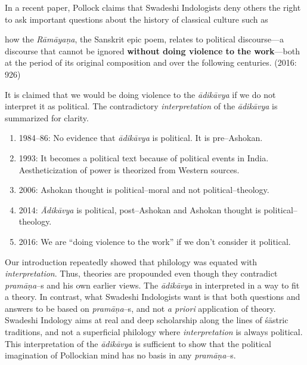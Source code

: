 In a recent paper, Pollock claims that Swadeshi Indologists deny others the right to ask important questions about the history of classical culture such as

\begin{myquote}
how the \textit{Rāmāyaṇa}, the Sanskrit epic poem, relates to political discourse—a discourse that cannot be ignored \textbf{without doing violence to the work}—both at the period of its original composition and over the following centuries. (2016: 926)
\end{myquote}

It is claimed that we would be doing violence to the \textit{ādikāvya} if we do not interpret it as political. The contradictory \textit{interpretation} of the \textit{ādikāvya }is summarized for clarity.

\begin{enumerate}
\item 1984–86: No evidence that \textit{ādikāvya }is political. It is pre–Ashokan.

 \item 1993: It becomes a political text because of political events in India. Aestheticization of power is theorized from Western sources.

 \item 2006: Ashokan thought is political–moral and not political–theology.

 \item 2014: \textit{Ādikāvya }is political, post–Ashokan and Ashokan thought is political–theology.

 \item 2016: We are “doing violence to the work” if we don’t consider it political.

\end{enumerate}

Our introduction repeatedly showed that philology was equated with \textit{interpretation}. Thus, theories are propounded even though they contradict\textit{ pramāṇa}–s and his own earlier views. The\textit{ ādikāvya} in interpreted in a way to fit a theory. In contrast, what Swadeshi Indologists want is that both questions and answers to be based on \textit{pramāṇa}–s, and not \textit{a priori} application of theory. Swadeshi Indology aims at real and deep scholarship along the lines of śāstric traditions, and not a superficial philology where \textit{interpretation} is always political. This interpretation of the \textit{ādikāvya }is sufficient to show that the political imagination of Pollockian mind has no basis in any \textit{pramāṇa}–s.

